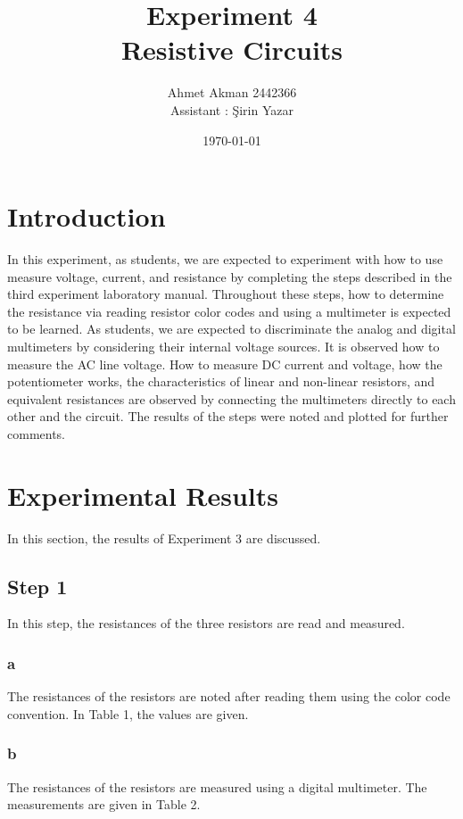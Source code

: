 \documentclass[letterpaper,12pt]{article}
\begin{document}
\title{Experiment 4 \protect\\Resistive Circuits}
\author{Ahmet Akman 2442366 \protect\\ Assistant : Şirin Yazar}
\date{\today}
\maketitle



\section{Introduction} 
In this experiment, as students, we are expected to experiment with how to use measure voltage, current, and resistance by completing the steps described in the third experiment laboratory manual. Throughout these steps, how to determine the resistance via reading resistor color codes and using a multimeter is expected to be learned. As students, we are expected to discriminate the analog and digital multimeters by considering their internal voltage sources. It is observed how to measure the AC line voltage. How to measure DC current and voltage, how the potentiometer works, the characteristics of linear and non-linear resistors, and equivalent resistances are observed by connecting the multimeters directly to each other and the circuit. The results of the steps were noted and plotted for further comments.
\section{Experimental Results}
In this section, the results of Experiment 3 are discussed.
\subsection{Step 1}
In this step, the resistances of the three resistors are read and measured. 
\subsubsection{a} 
The resistances of the resistors are noted after reading them using the color code convention. In Table 1, the values are given. 

\subsubsection{b} 
The resistances of the resistors are measured using a digital multimeter. The measurements are given in Table 2.
\end{document}
